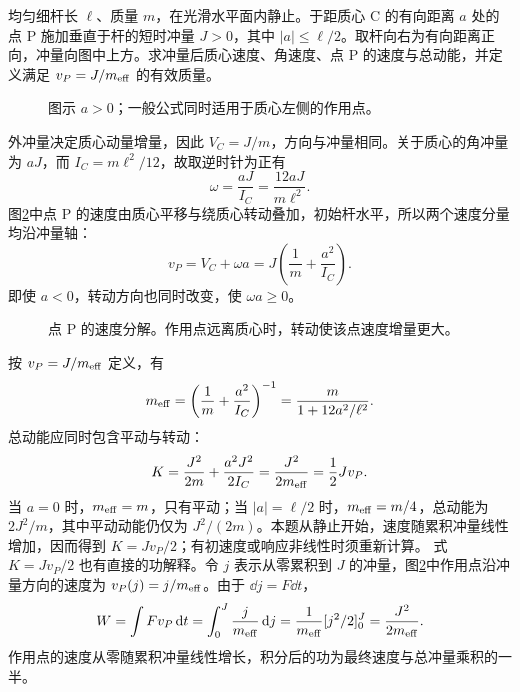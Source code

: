 \begin{exercise}[偏心冲量与作用点的有效质量]\label{deep3:problem-exercise-11}\label{deep3:ex:d3-h11}
均匀细杆长 $\ell$、质量 $m$，在光滑水平面内静止。于距质心 C 的有向距离 $a$ 处的点 P 施加垂直于杆的短时冲量 $J>0$，其中 $|a|\le\ell/2$。取杆向右为有向距离正向，冲量向图中上方。求冲量后质心速度、角速度、点 P 的速度与总动能，并定义满足 $v_P=J/m_{\rm eff}$ 的有效质量。
\end{exercise}
\begin{figure}[H]\centering
{}
\caption{图示 $a>0$；一般公式同时适用于质心左侧的作用点。}\label{deep3:fig:d3-h11-q}
\end{figure}
\begin{solution}
外冲量决定质心动量增量，因此 $V_C=J/m$，方向与冲量相同。关于质心的角冲量为 $aJ$，而 $I_C=m\ell^2/12$，故取逆时针为正有
\[
\omega=\frac{aJ}{I_C}=\frac{12aJ}{m\ell^2}.
\]
图\ref{deep3:fig:d3-h11-s}中点 P 的速度由质心平移与绕质心转动叠加，初始杆水平，所以两个速度分量均沿冲量轴：
\[
v_P=V_C+\omega a
=J\left(\frac1m+\frac{a^2}{I_C}\right).
\]
即使 $a<0$，转动方向也同时改变，使 $\omega a\ge0$。
\begin{figure}[H]\centering
{}
\caption{点 P 的速度分解。作用点远离质心时，转动使该点速度增量更大。}\label{deep3:fig:d3-h11-s}
\end{figure}
按 $v_P=J/m_{\rm eff}$ 定义，有
\[
m_{\rm eff}=\left(\frac1m+\frac{a^2}{I_C}\right)^{-1}
=\frac{m}{1+12a^2/\ell^2}.
\]
总动能应同时包含平动与转动：
\[
K=\frac{J^2}{2m}+\frac{a^2J^2}{2I_C}
=\frac{J^2}{2m_{\rm eff}}=\frac12Jv_P.
\]
当 $a=0$ 时，$m_{\rm eff}=m$，只有平动；当 $|a|=\ell/2$ 时，$m_{\rm eff}=m/4$，总动能为 $2J^2/m$，其中平动动能仍仅为 $J^2/(2m)$。本题从静止开始，速度随累积冲量线性增加，因而得到 $K=Jv_P/2$；有初速度或响应非线性时须重新计算。
式 $K=Jv_P/2$ 也有直接的功解释。令 $j$ 表示从零累积到 $J$ 的冲量，图\ref{deep3:fig:d3-h11-s}中作用点沿冲量方向的速度为 $v_P(j)=j/m_{\rm eff}$。由于 $\dd j=F\dd t$，
\[
W=\int Fv_P\mathop{}\!\mathrm d t=\int_0^J\frac{j}{m_{\rm eff}}\mathop{}\!\mathrm d j
=\frac1{m_{\rm eff}}[j^2/2]_0^J=\frac{J^2}{2m_{\rm eff}}.
\]
作用点的速度从零随累积冲量线性增长，积分后的功为最终速度与总冲量乘积的一半。

\end{solution}


